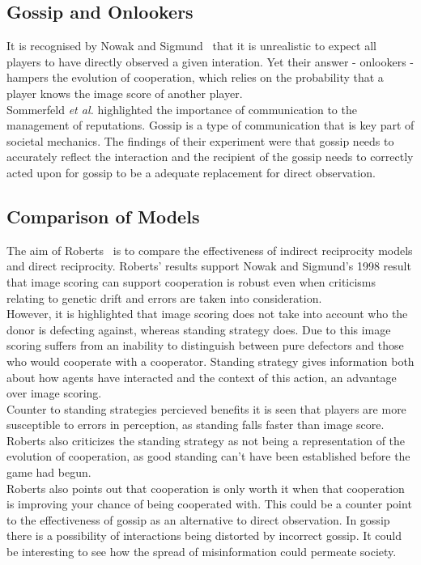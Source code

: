 \documentclass[twoside,twocolumn]{article}
\begin{document}
\subsection{Gossip and Onlookers}
It is recognised by Nowak and Sigmund~\cite{evol_indirect_image} that it is unrealistic to expect all players to have directly observed a given interation. Yet their answer - onlookers - hampers the evolution of cooperation, which relies on the probability that a player knows the image score of another player.\\
Sommerfeld \textit{et al.} highlighted the importance of communication to the management of reputations. Gossip is a type of communication that is key part of societal mechanics. The findings of their experiment were that gossip needs to accurately reflect the interaction and the recipient of the gossip needs to correctly acted upon for gossip to be a adequate replacement for direct observation.

\subsection{Comparison of Models}
The aim of Roberts~\cite{evoldirindir} is to compare the effectiveness of indirect reciprocity models and direct reciprocity. Roberts' results support Nowak and Sigmund's 1998 result that image scoring can support cooperation is robust even when criticisms relating to genetic drift and errors are taken into consideration.\\
However, it is highlighted that image scoring does not take into account who the donor is defecting against, whereas standing strategy does. Due to this image scoring suffers from an inability to distinguish between pure defectors and those who would cooperate with a cooperator. Standing strategy gives information both about how agents have interacted and the context of this action, an advantage over image scoring.\\
Counter to standing strategies percieved benefits it is seen that players are more susceptible to errors in perception, as standing falls faster than image score. Roberts also criticizes the standing strategy as not being a representation of the evolution of cooperation, as good standing can't have been established before the game had begun.\\
Roberts also points out that cooperation is only worth it when that cooperation is improving your chance of being cooperated with. This could be a counter point to the effectiveness of gossip as an alternative to direct observation. In gossip there is a possibility of interactions being distorted by incorrect gossip. It could be interesting to see how the spread of misinformation could permeate society.
\end{document}
